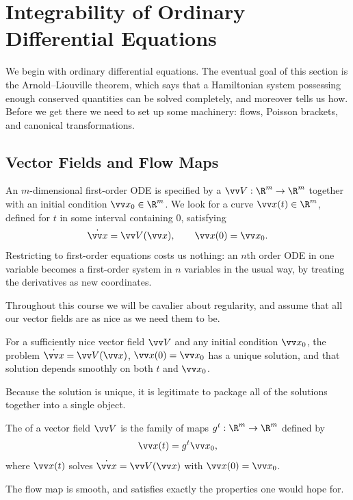 \section{Integrability of Ordinary Differential Equations}

We begin with ordinary differential equations. The eventual goal of this section is the Arnold--Liouville theorem, which says that a Hamiltonian system possessing enough conserved quantities can be solved completely, and moreover tells us how. Before we get there we need to set up some machinery: flows, Poisson brackets, and canonical transformations.

\subsection{Vector Fields and Flow Maps}

An $m$-dimensional first-order ODE is specified by a  $\vv V : \R^m \to \R^m$ together with an initial condition $\vv x_0 \in \R^m$. We look for a curve $\vv x(t) \in \R^m$, defined for $t$ in some interval containing $0$, satisfying
$$
\dot{\vv x} = \vv V(\vv x), \qquad \vv x(0) = \vv x_0.
$$
Restricting to first-order equations costs us nothing: an $n$th order ODE in one variable becomes a first-order system in $n$ variables in the usual way, by treating the derivatives as new coordinates.

Throughout this course we will be cavalier about regularity, and assume that all our vector fields are as nice as we need them to be.

\begin{fact}
	For a sufficiently nice vector field $\vv V$ and any initial condition $\vv x_0$, the problem $\dot{\vv x} = \vv V(\vv x)$, $\vv x(0) = \vv x_0$ has a unique solution, and that solution depends smoothly on both $t$ and $\vv x_0$.
\end{fact}

Because the solution is unique, it is legitimate to package all of the solutions together into a single object.

\begin{definition}
	The  of a vector field $\vv V$ is the family of maps $g^t : \R^m \to \R^m$ defined by
	$$
	\vv x(t) = g^t \vv x_0,
	$$
	where $\vv x(t)$ solves $\dot{\vv x} = \vv V(\vv x)$ with $\vv x(0) = \vv x_0$.
\end{definition}

The flow map is smooth, and satisfies exactly the properties one would hope for.

